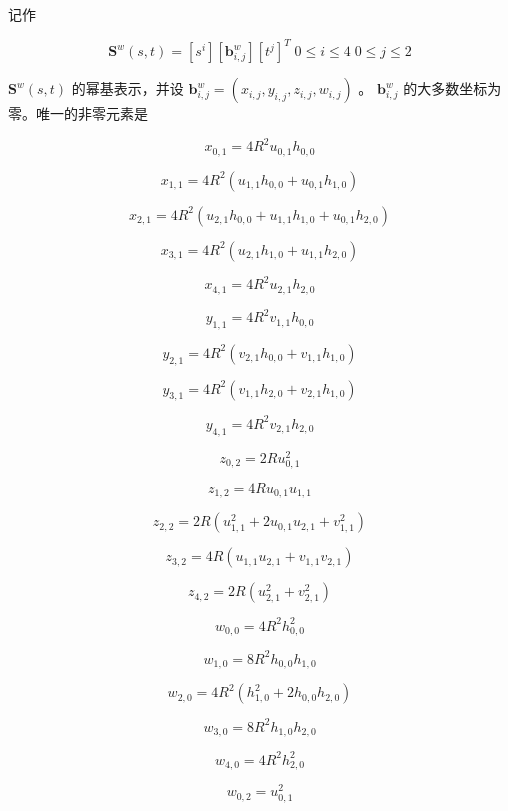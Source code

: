 \documentclass[../main.tex]{subfiles}
\begin{document}
记作

\[
{\mathbf{S}}^{w}\left( {s,t}\right)  = \left\lbrack  {s}^{i}\right\rbrack  \left\lbrack  {\mathbf{b}}_{i,j}^{w}\right\rbrack  {\left\lbrack  {t}^{j}\right\rbrack  }^{T}\;0 \leq  i \leq  4\;0 \leq  j \leq  2 \tag{8.27}
\]

\({\mathbf{S}}^{w}\left( {s,t}\right)\) 的幂基表示，并设 \({\mathbf{b}}_{i,j}^{w} = \left( {{x}_{i,j},{y}_{i,j},{z}_{i,j},{w}_{i,j}}\right)\) 。 \({\mathbf{b}}_{i,j}^{w}\) 的大多数坐标为零。唯一的非零元素是

\[
{x}_{0,1} = 4{R}^{2}{u}_{0,1}{h}_{0,0}
\]

\[
{x}_{1,1} = 4{R}^{2}\left( {{u}_{1,1}{h}_{0,0} + {u}_{0,1}{h}_{1,0}}\right)
\]

\[
{x}_{2,1} = 4{R}^{2}\left( {{u}_{2,1}{h}_{0,0} + {u}_{1,1}{h}_{1,0} + {u}_{0,1}{h}_{2,0}}\right)
\]

\[
{x}_{3,1} = 4{R}^{2}\left( {{u}_{2,1}{h}_{1,0} + {u}_{1,1}{h}_{2,0}}\right)
\]

\[
{x}_{4,1} = 4{R}^{2}{u}_{2,1}{h}_{2,0} \tag{8.28}
\]

\[
{y}_{1,1} = 4{R}^{2}{v}_{1,1}{h}_{0,0}
\]

\[
{y}_{2,1} = 4{R}^{2}\left( {{v}_{2,1}{h}_{0,0} + {v}_{1,1}{h}_{1,0}}\right)
\]

\[
{y}_{3,1} = 4{R}^{2}\left( {{v}_{1,1}{h}_{2,0} + {v}_{2,1}{h}_{1,0}}\right)
\]

\[
{y}_{4,1} = 4{R}^{2}{v}_{2,1}{h}_{2,0} \tag{8.29}
\]

\[
{z}_{0,2} = {2R}{u}_{0,1}^{2}
\]

\[
{z}_{1,2} = {4R}{u}_{0,1}{u}_{1,1}
\]

\[
{z}_{2,2} = {2R}\left( {{u}_{1,1}^{2} + 2{u}_{0,1}{u}_{2,1} + {v}_{1,1}^{2}}\right)
\]

\[
{z}_{3,2} = {4R}\left( {{u}_{1,1}{u}_{2,1} + {v}_{1,1}{v}_{2,1}}\right)
\]

\[
{z}_{4,2} = {2R}\left( {{u}_{2,1}^{2} + {v}_{2,1}^{2}}\right)  \tag{8.30}
\]

\[
{w}_{0,0} = 4{R}^{2}{h}_{0,0}^{2}
\]

\[
{w}_{1,0} = 8{R}^{2}{h}_{0,0}{h}_{1,0}
\]

\[
{w}_{2,0} = 4{R}^{2}\left( {{h}_{1,0}^{2} + 2{h}_{0,0}{h}_{2,0}}\right)
\]

\[
{w}_{3,0} = 8{R}^{2}{h}_{1,0}{h}_{2,0}
\]

\[
{w}_{4,0} = 4{R}^{2}{h}_{2,0}^{2}
\]

\[
{w}_{0,2} = {u}_{0,1}^{2}
\]
\end{document}
